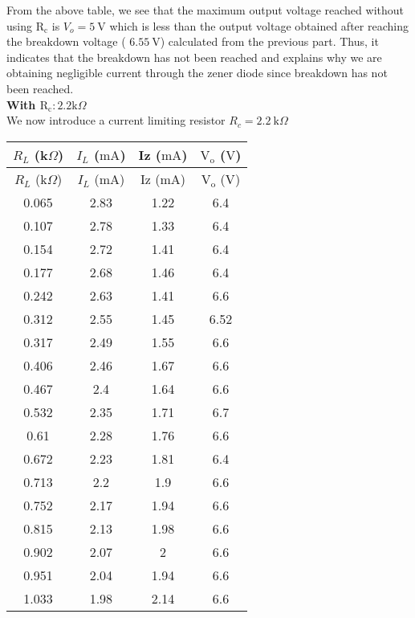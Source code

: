 \documentclass{scrartcl}
\begin{document}
\noindent
From the above table, we see that the maximum output voltage reached without using $\mathrm{R_c}$ is $V_o = 5 \ \mathrm{V}$ which is less than the output voltage obtained after reaching the breakdown voltage ( $6.55\ \mathrm{V}$) calculated from the previous part. Thus, it indicates that the breakdown has not been reached and explains why we are obtaining negligible current through the zener diode since breakdown has not been reached. \\[0.3cm]
\textbf{With $\mathrm{R_c}: 2.2 \mathrm{k}\Omega$ }\\[0.3cm]
We now introduce a current limiting resistor $R_c = 2.2 \ \mathrm{k}\Omega$

\begin{longtable}{|c|c|c|c|} 
        \hline
        $R_L$ (k$\Omega$) & {$I_L$ ($\mathrm{mA}$)} & {Iz ($\mathrm{mA}$)} & {$\mathrm{V_o}$ ($\mathrm{V}$)} \\ \hline
        \endfirsthead
        \hline 
        {$R_L$ (k$\Omega$)} & {$I_L$ ($\mathrm{mA}$)} & {Iz ($\mathrm{mA}$)} & {$\mathrm{V_o}$ ($\mathrm{V}$)} \\ \hline
        \endhead
        
        \hline
        \endfoot
        
        \hline
        \endlastfoot
        
        0.065       & 2.83      & 1.22    & 6.4     \\ \hline
        0.107       & 2.78      & 1.33    & 6.4     \\ \hline
        0.154       & 2.72      & 1.41    & 6.4     \\ \hline
        0.177       & 2.68      & 1.46    & 6.4     \\ \hline
        0.242       & 2.63      & 1.41    & 6.6     \\ \hline
        0.312       & 2.55      & 1.45    & 6.52    \\ \hline
        0.317       & 2.49      & 1.55    & 6.6     \\ \hline
        0.406       & 2.46      & 1.67    & 6.6     \\ \hline
        0.467       & 2.4       & 1.64    & 6.6     \\ \hline
        0.532       & 2.35      & 1.71    & 6.7     \\ \hline
        0.61        & 2.28      & 1.76    & 6.6     \\ \hline
        0.672       & 2.23      & 1.81    & 6.4     \\ \hline
        0.713       & 2.2       & 1.9     & 6.6     \\ \hline
        0.752       & 2.17      & 1.94    & 6.6     \\ \hline
        0.815       & 2.13      & 1.98    & 6.6     \\ \hline
        0.902       & 2.07      & 2       & 6.6     \\ \hline
        0.951       & 2.04      & 1.94    & 6.6     \\ \hline
        1.033       & 1.98      & 2.14    & 6.6     \\ \hline
        
        \end{longtable}
\end{document}
